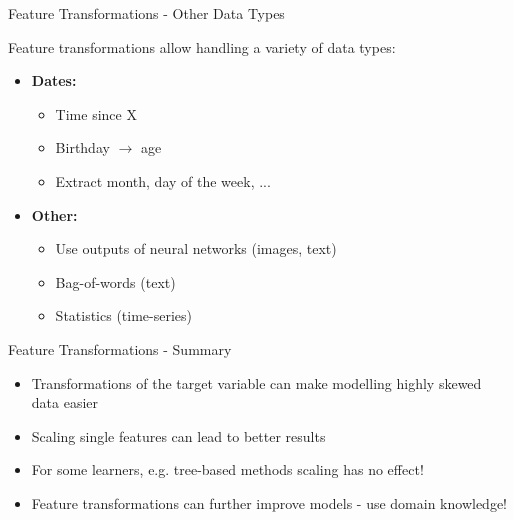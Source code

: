 \documentclass[11pt,compress,t,notes=noshow, xcolor=table]{beamer}
\begin{document}
\begin{vbframe}{Feature Transformations - Other Data Types}

Feature transformations allow handling a variety of data types:

\lz

\begin{itemize}
\item \textbf{Dates:}
  \begin{itemize}
  \item Time since X
  \item Birthday $\rightarrow$ age
  \item Extract month, day of the week, ...
  \end{itemize}

\lz

\item \textbf{Other:}
  \begin{itemize}
  \item Use outputs of neural networks (images, text)
  \item Bag-of-words (text)
  \item Statistics (time-series)
  \end{itemize}
\end{itemize}

\end{vbframe}

\begin{vbframe}{Feature Transformations - Summary}

\begin{itemize}
\item Transformations of the target variable can make modelling highly skewed data easier

\item Scaling single features can lead to better results

\item For some learners, e.g. tree-based methods scaling has no effect!

\item Feature transformations can further improve models - use domain knowledge!
\end{itemize}

\end{vbframe}

% 
% 
% 
\end{document}
